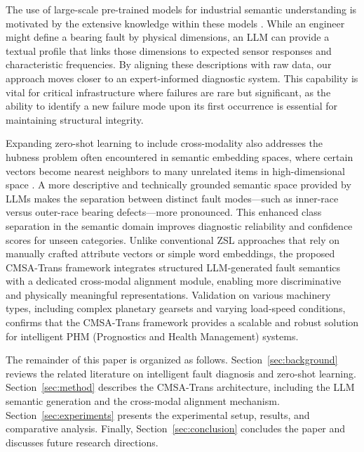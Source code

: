\documentclass[journal]{IEEEtran}
\begin{document}
The use of large-scale pre-trained models for industrial semantic understanding is motivated by the extensive knowledge within these models \cite{zhao2023brain}. While an engineer might define a bearing fault by physical dimensions, an LLM can provide a textual profile that links those dimensions to expected sensor responses and characteristic frequencies. By aligning these descriptions with raw data, our approach moves closer to an expert-informed diagnostic system. This capability is vital for critical infrastructure where failures are rare but significant, as the ability to identify a new failure mode upon its first occurrence is essential for maintaining structural integrity.

Expanding zero-shot learning to include cross-modality also addresses the hubness problem often encountered in semantic embedding spaces, where certain vectors become nearest neighbors to many unrelated items in high-dimensional space \cite{radovanovic2010hubs}. A more descriptive and technically grounded semantic space provided by LLMs makes the separation between distinct fault modes---such as inner-race versus outer-race bearing defects---more pronounced. This enhanced class separation in the semantic domain improves diagnostic reliability and confidence scores for unseen categories. Unlike conventional ZSL approaches that rely on manually crafted attribute vectors or simple word embeddings, the proposed CMSA-Trans framework integrates structured LLM-generated fault semantics with a dedicated cross-modal alignment module, enabling more discriminative and physically meaningful representations. Validation on various machinery types, including complex planetary gearsets and varying load-speed conditions, confirms that the CMSA-Trans framework provides a scalable and robust solution for intelligent PHM (Prognostics and Health Management) systems.

The remainder of this paper is organized as follows. Section~\ref{sec:background} reviews the related literature on intelligent fault diagnosis and zero-shot learning. Section~\ref{sec:method} describes the CMSA-Trans architecture, including the LLM semantic generation and the cross-modal alignment mechanism. Section~\ref{sec:experiments} presents the experimental setup, results, and comparative analysis. Finally, Section~\ref{sec:conclusion} concludes the paper and discusses future research directions.

\end{document}
